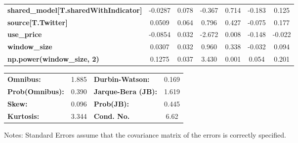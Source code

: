 \begin{center}
\begin{tabular}{lcccccc}
\textbf{shared\_model[T.sharedWithIndicator]} &      -0.0287  &        0.078     &    -0.367  &         0.714        &       -0.183    &        0.125     \\
\textbf{source[T.Twitter]}                    &       0.0509  &        0.064     &     0.796  &         0.427        &       -0.075    &        0.177     \\
\textbf{use\_price}                           &      -0.0854  &        0.032     &    -2.672  &         0.008        &       -0.148    &       -0.022     \\
\textbf{window\_size}                         &       0.0307  &        0.032     &     0.960  &         0.338        &       -0.032    &        0.094     \\
\textbf{np.power(window\_size, 2)}            &       0.1275  &        0.037     &     3.430  &         0.001        &        0.054    &        0.201     \\
\bottomrule
\end{tabular}
\begin{tabular}{lclc}
\textbf{Omnibus:}       &  1.885 & \textbf{  Durbin-Watson:     } &    0.169  \\
\textbf{Prob(Omnibus):} &  0.390 & \textbf{  Jarque-Bera (JB):  } &    1.619  \\
\textbf{Skew:}          &  0.096 & \textbf{  Prob(JB):          } &    0.445  \\
\textbf{Kurtosis:}      &  3.344 & \textbf{  Cond. No.          } &     6.62  \\
\bottomrule
\end{tabular}
\end{center}

Notes: \newline
 [1] Standard Errors assume that the covariance matrix of the errors is correctly specified.